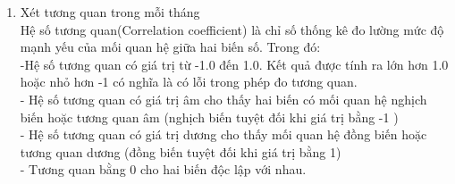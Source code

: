 \documentclass[a4paper]{article}
\theoremstyle{definition}
\begin{document}
\begin{enumerate}[i)]
\begin{enumerate}[1)]
\begin{itemize}
\begin{figure}[htp!]
    \end{figure}
    \end{itemize}
    \pagebreak
    \item Xét tương quan trong mỗi tháng \\
    Hệ số tương quan(Correlation coefficient) là chỉ số thống kê đo lường mức độ mạnh yếu của mối quan hệ giữa hai biến số. Trong đó: \\
    -Hệ số tương quan có giá trị từ -1.0 đến 1.0. Kết quả được tính ra lớn hơn 1.0 hoặc nhỏ hơn -1 có nghĩa là có lỗi trong phép đo tương quan.\\
    - Hệ số tương quan có giá trị âm cho thấy hai biến có mối quan hệ nghịch biến hoặc tương quan âm (nghịch biến tuyệt đối khi giá trị bằng -1 )\\
    - Hệ số tương quan có giá trị dương cho thấy mối quan hệ đồng biến hoặc tương quan dương (đồng biến tuyệt đối khi giá trị bằng 1)\\
    - Tương quan bằng 0 cho hai biến độc lập với nhau.
    

\end{enumerate}
\end{enumerate}
\end{document}
